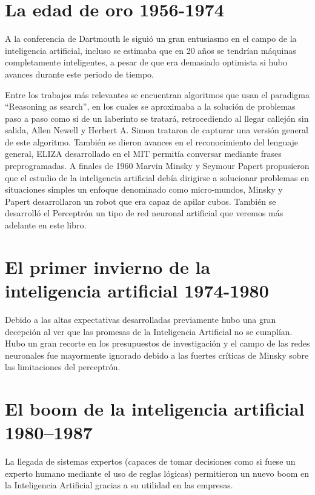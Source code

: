 \documentclass[11pt,fleqn]{book} %
\begin{document}
\section{La edad de oro 1956-1974} 

A la conferencia de Dartmouth le siguió un gran entusiasmo en el campo de la inteligencia artificial, incluso se estimaba que en 20 años se tendrían máquinas completamente inteligentes, a pesar de que era demasiado optimista si hubo avances durante este periodo de tiempo.

Entre los trabajos más relevantes se encuentran algoritmos que usan el paradigma “Reasoning as search”, en los cuales se aproximaba a la solución de problemas paso a paso como si de un laberinto se tratará, retrocediendo al llegar callejón sin salida, Allen Newell y Herbert A. Simon trataron de capturar una versión general de este algoritmo. También se dieron avances en el reconocimiento del lenguaje general, ELIZA desarrollado en el MIT permitía conversar mediante frases preprogramadas. A finales de 1960 Marvin Minsky y Seymour Papert propusieron que el estudio de la inteligencia artificial debía dirigirse a solucionar problemas en situaciones simples un enfoque denominado como micro-mundos, Minsky y Papert desarrollaron un robot que era capaz de apilar cubos. También se desarrolló el Perceptrón un tipo de red neuronal artificial que veremos más adelante en este libro.

\section{El primer invierno de la inteligencia artificial 1974-1980} 

Debido a las altas expectativas desarrolladas previamente hubo una gran decepción al ver que las promesas de la Inteligencia Artificial no se cumplían. Hubo un gran recorte en los presupuestos de investigación y el campo de las redes neuronales fue mayormente ignorado debido a las fuertes críticas de Minsky sobre las limitaciones del perceptrón.

\section{El boom de la inteligencia artificial 1980–1987} 

La llegada de sistemas expertos (capaces de tomar decisiones como si fuese un experto humano mediante el uso de reglas lógicas) permitieron un nuevo boom en la Inteligencia Artificial gracias a su utilidad en las empresas.
\end{document}
